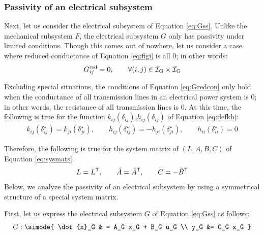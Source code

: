 \documentclass[tombow,dvipdfmx]{corona-a5-1.1}
\begin{document}
\smallskip
\subsubsection{Passivity of an electrical subsystem}
Next, let us consider the electrical subsystem of Equation \ref{eq:Gss}.
Unlike the mechanical subsystem $F$, the electrical subsystem $G$ only has passivity under limited conditions.
Though this comes out of nowhere, let us consider a case where reduced conductance of Equation \ref{eq:figi} is all 0; in other words:
\begin{align}\label{eq:Gredcon}
G^{\rm red}_{ij}=0,\qquad 
\forall (i, j) \in \mathcal{I}_{\rm G} \times \mathcal{I}_{\rm G}
\end{align}

Excluding special situations, the conditions of Equation \ref{eq:Gredcon} only hold when the conductance of all transmission lines in an electrical power system is 0; in other words, the resistance of all transmission lines is 0.
At this time, the following is true for the function $k_{ij}(\delta_{ij})$,$h_{ij}(\delta_{ij})$ of Equation \ref{eq:defkh}:
\begin{align*}
k_{ij}(\delta_{ij}^{\star}) =
k_{ji}(\delta_{ji}^{\star})
,\qquad
h_{ij}(\delta_{ij}^{\star}) = 
- h_{ji}(\delta_{ji}^{\star}),\qquad
h_{ii}(\delta_{ii}^{\star}) = 0
\end{align*}

Therefore, the following is true for the system matrix of $(L,A,B,C)$ of Equation \ref{eq:sysmats}.
\begin{align}\label{eq:sysmatst}
L=L^{\sf T} ,\qquad
\hat{A} = \hat{A}^{\sf T},\qquad
C= -\hat{B}^{\sf T}
\end{align}
Below, we analyze the passivity of an electrical subsystem by using a symmetrical structure of a special system matrix. 

First, let us express the electrical subsystem $G$ of Equation \ref{eq:Gss} as follows:
\begin{align}
G: \simode{
\dot{x}_G & = A_G x_G + B_G u_G \\
y_G &= C_G x_G
}
\end{align}
\end{document}
